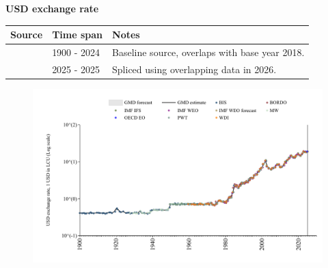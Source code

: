 \documentclass[12pt,a4paper,landscape]{article}
\begin{document}
\begin{adjustbox}{max totalsize={\paperwidth}{\paperheight},center}
\begin{minipage}[t][\textheight][t]{\textwidth}
\vspace*{0.5cm}
{}
\begin{center}
{\Large\bfseries USD exchange rate}
\end{center}
\vspace{0.5cm}
\begin{table}[H]
\centering
\small
\begin{tabular}{|l|l|l|}
\hline
\textbf{Source} & \textbf{Time span} & \textbf{Notes} \\
\hline
\rowcolor{white}\cite{BIS}& 1900 - 2024 &Baseline source, overlaps with base year 2018. \\
\rowcolor{lightgray}\cite{OECD_EO}& 2025 - 2025 &Spliced using overlapping data in 2026. \\
\hline
\end{tabular}
\end{table}
\begin{figure}[H]
\centering
\includegraphics[width=\textwidth,height=0.6\textheight,keepaspectratio]{graphs/ZAF_USDfx.pdf}
\end{figure}
\end{minipage}
\end{adjustbox}
\end{document}
